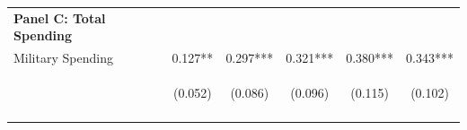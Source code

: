 \documentclass[dv_diss_main.tex]{subfiles}
\begin{document}
\begin{table}[H]
\begin{center}
{\begin{tabular}{lccccc}
     \multicolumn{1}{l}{\textbf{Panel C: Total Spending}} \\ 
    Military Spending & 0.127** & 0.297*** & 0.321*** & 0.380*** & 0.343*** \\
     & \begin{footnotesize}(0.052)\end{footnotesize} & \begin{footnotesize}(0.086)\end{footnotesize} & \begin{footnotesize}(0.096)\end{footnotesize} & \begin{footnotesize}(0.115)\end{footnotesize} & \begin{footnotesize}(0.102)\end{footnotesize} \\
    \vspace{-1.5pt} & \vspace{-1.5pt} & \vspace{-1.5pt} & \vspace{-1.5pt} & \vspace{-1.5pt} \\
    

\end{tabular}}
\end{center}
\end{table}
\end{document}
